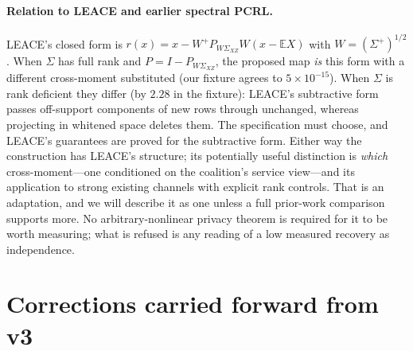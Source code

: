 \documentclass[10pt]{article}
\begin{document}
\paragraph{Relation to LEACE and earlier spectral PCRL.} LEACE's closed form is
$r(x)=x-W^{+}P_{W\Sigma_{XZ}}W(x-\mathbb{E}X)$ with $W=(\Sigma^{+})^{1/2}$ \citep[Thm.~4.2--4.3]{belrose2023leace}.
When $\Sigma$ has full rank and $P=I-P_{W\Sigma_{XZ}}$, the proposed map \emph{is} this form with a different
cross-moment substituted (our fixture agrees to $5\times10^{-15}$). When $\Sigma$ is rank deficient they
differ (by $2.28$ in the fixture): LEACE's subtractive form passes off-support components of new rows
through unchanged, whereas projecting in whitened space deletes them. The specification must choose, and
LEACE's guarantees are proved for the subtractive form. Either way the construction has LEACE's structure; its potentially useful distinction is \emph{which}
cross-moment---one conditioned on the coalition's service view---and its application to strong existing
channels with explicit rank controls. That is an adaptation, and we will describe it as one unless a
full prior-work comparison supports more. No arbitrary-nonlinear privacy theorem is required for it to be
worth measuring; what is refused is any reading of a low measured recovery as independence.


\section{Corrections carried forward from v3}
\label{app:carried}
\end{document}
